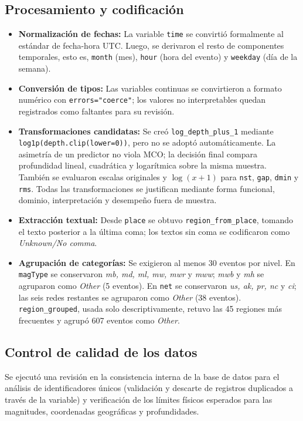 \documentclass{style}
\newcommand{\var}[1]{\texttt{#1}}
\begin{document}
\subsection{Procesamiento y codificación}
\begin{itemize}
    \item \textbf{Normalización de fechas:} La variable \var{time} se convirtió formalmente al estándar de fecha-hora UTC. Luego, se derivaron el resto de componentes temporales, esto es, \var{month} (mes), \var{hour} (hora del evento) y \var{weekday} (día de la semana).
    \item \textbf{Conversión de tipos:} Las variables continuas se convirtieron a formato numérico con \texttt{errors="coerce"}; los valores no interpretables quedan registrados como faltantes para su revisión.
    
    \item \textbf{Transformaciones candidatas:} Se creó \var{log\_depth\_plus\_1} mediante \texttt{log1p(depth.clip(lower=0))}, pero no se adoptó automáticamente. La asimetría de un predictor no viola MCO; la decisión final compara profundidad lineal, cuadrática y logarítmica sobre la misma muestra. También se evaluaron escalas originales y $\log(x+1)$ para \var{nst}, \var{gap}, \var{dmin} y \var{rms}. Todas las transformaciones se justifican mediante forma funcional, dominio, interpretación y desempeño fuera de muestra.
    

    \item \textbf{Extracción textual:} Desde \var{place} se obtuvo \var{region\_from\_place}, tomando el texto posterior a la última coma; los textos sin coma se codificaron como \textit{Unknown/No comma}.


    \item \textbf{Agrupación de categorías:} Se exigieron al menos 30 eventos por nivel. En \var{magType} se conservaron \textit{mb, md, ml, mw, mwr} y \textit{mww}; \textit{mwb} y \textit{mh} se agruparon como \textit{Other} (5 eventos). En \var{net} se conservaron \textit{us, ak, pr, nc} y \textit{ci}; las seis redes restantes se agruparon como \textit{Other} (38 eventos). \var{region\_grouped}, usada solo descriptivamente, retuvo las 45 regiones más frecuentes y agrupó 607 eventos como \textit{Other}.

\end{itemize}

\subsection{Control de calidad de los datos}
Se ejecutó una revisión en la consistencia interna de la base de datos para el análisis de identificadores únicos (validación y descarte de registros duplicados a través de la variable) y verificación de los límites físicos esperados para las magnitudes, coordenadas geográficas y profundidades.
    
\end{document}
